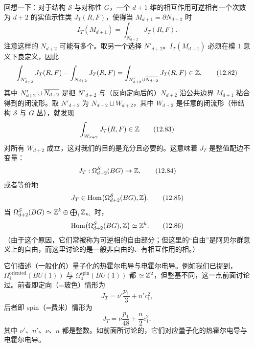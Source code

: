 回想一下：对于结构 $\mathcal S$ 与对称性 $G$，一个 $d+1$ 维的相互作用可逆相有一个次数为 $d+2$ 的实值示性类 $J_T(R,F)$，使得当 $M_{d+1}=\partial N_{d+2}$ 时
\begin{equation}
  I_T(M_{d+1})=\int_{N_{d+2}}J_T(R,F).
  \tag{12.81}
\end{equation}
注意这样的 $N_{d+2}$ 可能有多个。取另一个选择 $N'_{d+2}$。$I_T(M_{d+1})$ 必须在模 $1$ 意义下良定义，因此
\begin{equation}
  \int_{N'_{d+2}}J_T(R,F)-\int_{N_{d+2}}J_T(R,F)
  =\int_{N'_{d+2}\cup\overline{N_{d+2}}}J_T(R,F)\in\mathbb{Z},
  \tag{12.82}
\end{equation}
其中 $N'_{d+2}\cup\overline{N_{d+2}}$ 是把 $N'_{d+2}$ 与（反向定向后的）$N_{d+2}$ 沿公共边界 $M_{d+1}$ 粘合得到的闭流形。取 $N'_{d+2}$ 为 $N_{d+2}\sqcup W_{d+2}$，其中 $W_{d+2}$ 是任意的闭流形（带结构 $\mathcal S$ 与 $G$ 丛），就发现
\begin{equation}
  \int_{W_{d+2}}J_T(R,F)\in\mathbb{Z}
  \tag{12.83}
\end{equation}
对所有 $W_{d+2}$ 成立，这对我们的目的是充分且必要的。这意味着 $J_T$ 是整值配边不变量：
\begin{equation}
  J_T:\Omega^{\mathcal S}_{d+2}(BG)\to\mathbb{Z},
  \tag{12.84}
\end{equation}
或者等价地
\begin{equation}
  J_T\in\operatorname{Hom}\bigl(\Omega^{\mathcal S}_{d+2}(BG),\mathbb{Z}\bigr).
  \tag{12.85}
\end{equation}
当 $\Omega^{\mathcal S}_{d+2}(BG)\simeq\mathbb{Z}^k\oplus\bigoplus_i\mathbb{Z}_{n_i}$ 时，
\begin{equation}
  \operatorname{Hom}\bigl(\Omega^{\mathcal S}_{d+2}(BG),\mathbb{Z}\bigr)\simeq\mathbb{Z}^k .
  \tag{12.86}
\end{equation}
（由于这个原因，它们常被称为可逆相的自由部分；但这里的“自由”是阿贝尔群意义上的自由，而这里讨论的是一般非自由的、有相互作用的相。）

它们描述（一般化的）量子化的热霍尔电导与电霍尔电导。例如我们已提到，$\Omega^{\mathrm{oriented}}_4(BU(1))$ 与 $\Omega^{\mathrm{spin}}_4(BU(1))$ 都 $\simeq\mathbb{Z}^2$，但整基不同，这一点前面讨论过。前者即定向（=玻色）情形为
\begin{equation}
  J_T=\nu'\frac{p_1}{3}+n'c_1^2,
  \tag{12.87}
\end{equation}
后者即 spin（=费米）情形为
\begin{equation}
  J_T=\nu\frac{p_1}{48}+\frac{n}{2}c_1^2,
  \tag{12.88}
\end{equation}
其中 $\nu'$、$n'$、$\nu$、$n$ 都是整数。如前面所讨论的，它们对应量子化的热霍尔电导与电霍尔电导。

